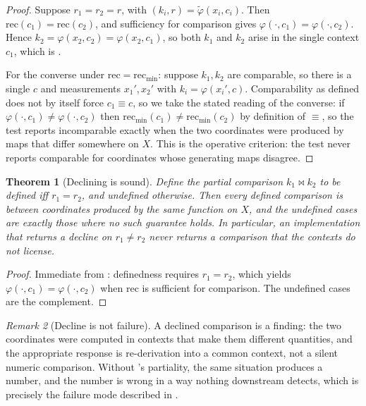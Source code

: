 \documentclass[11pt,a4paper]{article}
\newtheorem{theorem}{Theorem}[section]
\theoremstyle{definition}
\theoremstyle{remark}
\newtheorem{remark}[theorem]{Remark}
\newcommand{\rec}{\mathrm{rec}}
\begin{document}
\begin{proof}
Suppose $r_1 = r_2 = r$, with $(k_i,r) = \tilde{\varphi}(x_i,c_i)$. Then
$\rec(c_1) = \rec(c_2)$, and sufficiency for comparison gives
$\varphi(\cdot,c_1) = \varphi(\cdot,c_2)$. Hence
$k_2 = \varphi(x_2,c_2) = \varphi(x_2,c_1)$, so both $k_1$ and $k_2$
arise in the single context $c_1$, which is .

For the converse under $\rec = \rec_{\min}$: suppose $k_1,k_2$ are
comparable, so there is a single $c$ and measurements $x_1',x_2'$ with
$k_i = \varphi(x_i',c)$. Comparability as defined does not by itself
force $c_1 \equiv c$, so we take the stated reading of the converse:
if $\varphi(\cdot,c_1) \neq \varphi(\cdot,c_2)$ then
$\rec_{\min}(c_1) \neq \rec_{\min}(c_2)$ by definition of $\equiv$, so
the test reports incomparable exactly when the two coordinates were
produced by maps that differ somewhere on $X$. This is the operative
criterion: the test never reports comparable for coordinates whose
generating maps disagree.
\end{proof}

\begin{theorem}[Declining is sound]\label{thm:decline-sound}
Define the partial comparison
$k_1 \bowtie k_2$ to be defined iff $r_1 = r_2$, and undefined
otherwise. Then every defined comparison is between coordinates produced
by the same function on $X$, and the undefined cases are exactly those
where no such guarantee holds. In particular, an implementation that
returns a \emph{decline} on $r_1 \neq r_2$ never returns a comparison
that the contexts do not license.
\end{theorem}

\begin{proof}
Immediate from : definedness requires $r_1=r_2$,
which yields $\varphi(\cdot,c_1) = \varphi(\cdot,c_2)$ when $\rec$ is
sufficient for comparison. The undefined cases are the complement.
\end{proof}

\begin{remark}[Decline is not failure]\label{rem:decline}
A declined comparison is a finding: the two coordinates were computed in
contexts that make them different quantities, and the appropriate
response is re-derivation into a common context, not a silent numeric
comparison. Without 's partiality, the same
situation produces a number, and the number is wrong in a way nothing
downstream detects, which is precisely the failure mode described in
.
\end{remark}
\end{document}
